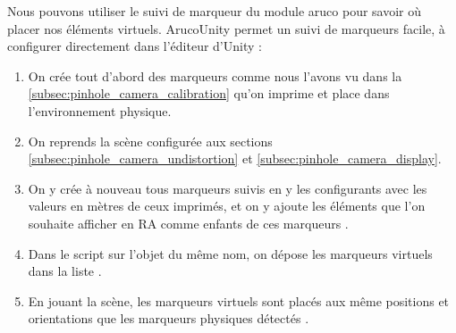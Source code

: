 Nous pouvons utiliser le suivi de marqueur du module aruco pour savoir où placer nos éléments virtuels. ArucoUnity permet un suivi de marqueurs facile, à configurer directement dans l'éditeur d'Unity :
\begin{enumerate}
  \item On crée tout d'abord des marqueurs comme nous l'avons vu dans la \autoref{subsec:pinhole_camera_calibration} qu'on imprime et place dans l'environnement physique.
  \item On reprends la scène configurée aux sections \ref{subsec:pinhole_camera_undistortion} et \ref{subsec:pinhole_camera_display}.
  \item On y crée à nouveau tous marqueurs suivis en y les configurants avec les valeurs en mètres de ceux imprimés, et on y ajoute les éléments que l'on souhaite afficher en RA comme enfants de ces marqueurs .
  \item Dans le script  sur l'objet du même nom, on dépose les marqueurs virtuels dans la liste  .
  \item En jouant la scène, les marqueurs virtuels sont placés aux même positions et orientations que les marqueurs physiques détectés .
\end{enumerate}

